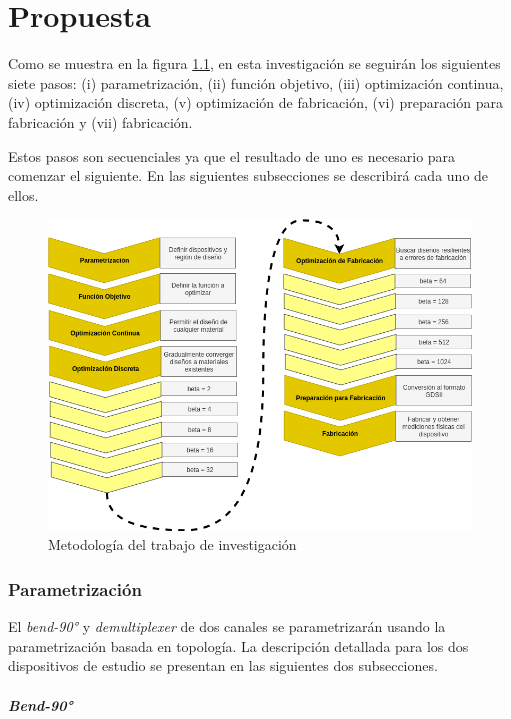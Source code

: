 \chapter{Propuesta}

Como se muestra en la figura \ref{fig:pipeline}, en esta investigación se seguirán los siguientes siete pasos:
(i) parametrización, 
(ii) función objetivo, 
(iii) optimización continua,
(iv) optimización discreta,
(v) optimización de fabricación,
(vi) preparación para fabricación y
(vii) fabricación.

Estos pasos son secuenciales ya que el resultado de uno es necesario para comenzar el siguiente.
En las siguientes subsecciones se describirá cada uno de ellos.

\begin{figure}[ht]
  \centering
  \includegraphics[width=\textwidth]{image/proposal/pipeline.png}
  \caption{Metodología del trabajo de investigación}
  \label{fig:pipeline}
\end{figure}

\subsection{Parametrización}

El \emph{bend-90°} y \emph{demultiplexer} de dos canales se parametrizarán usando la parametrización basada en topología.
La descripción detallada para los dos dispositivos de estudio se presentan en las siguientes dos subsecciones.

\subsubsection{\emph{Bend-90°}}

